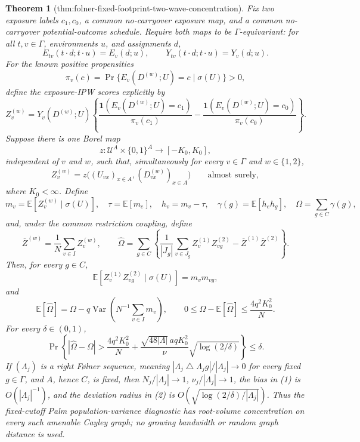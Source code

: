 \documentclass{article}
\newtheorem{theorem}{Theorem}
\begin{document}
\begin{theorem}[thm:folner-fixed-footprint-two-wave-concentration]
Fix two exposure labels \(c_1,c_0\), a common no-carryover exposure map, and a common no-carryover potential-outcome schedule.  Require both maps to be \(\Gamma\)-equivariant: for all \(t,v\in\Gamma\), environments \(u\), and assignments \(d\),
\[
 E_{tv}(t\cdot d;t\cdot u)=E_v(d;u),
 \qquad
 Y_{tv}(t\cdot d;t\cdot u)=Y_v(d;u).
\]
For the known positive propensities
\[
 \pi_v(c)=\Pr\{E_v(D^{(w)};U)=c\mid\sigma(U)\}>0,
\]
define the exposure-IPW scores explicitly by
\[
 Z_v^{(w)}=Y_v(D^{(w)};U)
 \left\{\frac{\mathbf 1(E_v(D^{(w)};U)=c_1)}{\pi_v(c_1)}
 -\frac{\mathbf 1(E_v(D^{(w)};U)=c_0)}{\pi_v(c_0)}\right\}.
\]
Suppose there is one Borel map
\[
 z:\mathcal U^A\times\{0,1\}^A\longrightarrow[-K_0,K_0],
\]
independent of \(v\) and \(w\), such that, simultaneously for every \(v\in\Gamma\) and \(w\in\{1,2\}\),
\[
 Z_v^{(w)}
 =z\bigl((U_{vx})_{x\in A},(D_{vx}^{(w)})_{x\in A}\bigr)
 \qquad\text{almost surely},
\]
where \(K_0<\infty\).  Define
\[
 m_v=\mathbb E[Z_v^{(w)}\mid\sigma(U)],\quad
 \tau=\mathbb E[m_e],\quad h_v=m_v-\tau,\quad
 \gamma(g)=\mathbb E[h_eh_g],\quad
 \Omega=\sum_{g\in C}\gamma(g),
\]
and, under the common restriction coupling, define
\[
 \overline Z^{(w)}=\frac1N\sum_{v\in I}Z_v^{(w)},\qquad
 \widehat\Omega
 =\sum_{g\in C}\left\{
   \frac1{|J_g|}\sum_{v\in J_g}Z_v^{(1)}Z_{vg}^{(2)}
   -\overline Z^{(1)}\overline Z^{(2)}\right\}.
\]
Then, for every \(g\in C\),
\[
 \mathbb E[Z_v^{(1)}Z_{vg}^{(2)}\mid\sigma(U)]=m_vm_{vg},
\]
and
\[
 \mathbb E[\widehat\Omega]
 =\Omega-q\operatorname{Var}\!\left(N^{-1}\sum_{v\in I}m_v\right),
 \qquad
 0\le \Omega-\mathbb E[\widehat\Omega]
 \le \frac{4q^2K_0^2}{N}. \tag{1}
\]
For every \(\delta\in(0,1)\),
\[
 \Pr\!\left\{
  |\widehat\Omega-\Omega|>
  \frac{4q^2K_0^2}{N}
  +\frac{\sqrt{48|\Lambda|}\,a qK_0^2}{\nu}
    \sqrt{\log(2/\delta)}
 \right\}\le\delta. \tag{2}
\]
If \((\Lambda_j)\) is a right F\o lner sequence, meaning \(|\Lambda_j\mathbin\triangle\Lambda_jg|/|\Lambda_j|\to0\) for every fixed \(g\in\Gamma\), and \(A\), hence \(C\), is fixed, then \(N_j/|\Lambda_j|\to1\), \(\nu_j/|\Lambda_j|\to1\), the bias in (1) is \(O(|\Lambda_j|^{-1})\), and the deviation radius in (2) is \(O(\sqrt{\log(2/\delta)/|\Lambda_j|})\).  Thus the fixed-cutoff Palm population-variance diagnostic has root-volume concentration on every such amenable Cayley graph; no growing bandwidth or random graph distance is used.
\end{theorem}
\end{document}
